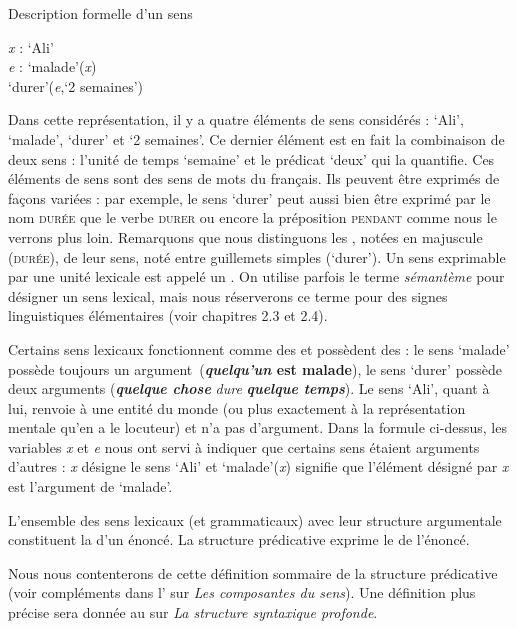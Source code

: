 \ea Description formelle d’un sens\\
\begin{center}
\textit{x} : ‘Ali’\\
\textit{e} : ‘malade’(\textit{x})\\
‘durer’(\textit{e},‘2 semaines’)
\end{center}
\z

Dans cette représentation, il y a quatre éléments de sens considérés : ‘Ali’, ‘malade’, ‘durer’ et ‘2 semaines’. Ce dernier élément est en fait la combinaison de deux sens : l’unité de temps ‘semaine’ et le prédicat ‘deux’ qui la quantifie. Ces éléments de sens sont des sens de mots du français. Ils peuvent être exprimés de façons variées : par exemple, le sens ‘durer’ peut aussi bien être exprimé par le nom \textsc{durée} que le verbe \textsc{durer} ou encore la préposition \textsc{pendant} comme nous le verrons plus loin. Remarquons que nous distinguons les , notées en majuscule (\textsc{durée}), de leur sens, noté entre guillemets simples (‘durer’). Un sens exprimable par une unité lexicale est appelé un . On utilise parfois le terme \textit{sémantème} pour désigner un sens lexical, mais nous réserverons ce terme pour des signes linguistiques élémentaires (voir chapitres 2.3 et 2.4).

Certains sens lexicaux fonctionnent comme des  et possèdent des  : le sens ‘malade’ possède toujours un argument~(\textbf{\textit{quelqu’un} est malade}), le sens ‘durer’ possède deux arguments (\textbf{\textit{quelque chose}} \textit{dure} \textbf{\textit{quelque temps}}). Le sens ‘Ali’, quant à lui, renvoie à une entité du monde (ou plus exactement à la représentation mentale qu’en a le locuteur) et n’a pas d’argument. Dans la formule ci-dessus, les variables \textit{x} et \textit{e} nous ont servi à indiquer que certains sens étaient arguments d’autres : \textit{x} désigne le sens ‘Ali’ et ‘malade’(\textit{x}) signifie que l’élément désigné par \textit{x} est l’argument de ‘malade’.

{L'ensemble des sens lexicaux (et grammaticaux) avec leur structure argumentale constituent la  d'un énoncé. La structure prédicative exprime le  de l’énoncé.}

Nous nous contenterons de cette définition sommaire de la structure prédicative (voir compléments dans l’ sur \textit{Les composantes du sens}). Une définition plus précise sera donnée au  sur \textit{La structure syntaxique profonde}.

